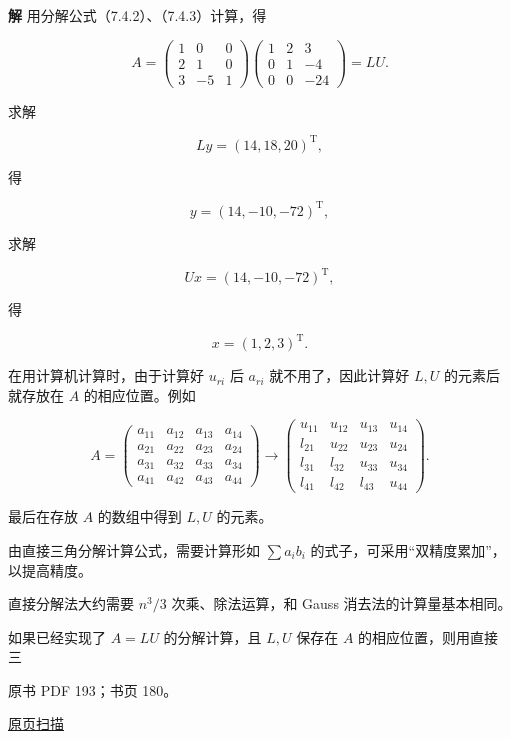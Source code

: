 \documentclass[
  10pt,
  fontset=fandol]{ctexart}
\begin{document}
\textbf{解} 用分解公式（7.4.2）、（7.4.3）计算，得

\[A=\begin{pmatrix}1&0&0\\2&1&0\\3&-5&1\end{pmatrix}
\begin{pmatrix}1&2&3\\0&1&-4\\0&0&-24\end{pmatrix}=LU.\]

求解

\[Ly=(14,18,20)^{\mathrm T},\]

得

\[y=(14,-10,-72)^{\mathrm T},\]

求解

\[Ux=(14,-10,-72)^{\mathrm T},\]

得

\[x=(1,2,3)^{\mathrm T}.\]

在用计算机计算时，由于计算好 \(u_{ri}\) 后 \(a_{ri}\) 就不用了，因此计算好 \(L,U\) 的元素后就存放在 \(A\) 的相应位置。例如

\[
A=\begin{pmatrix}
a_{11}&a_{12}&a_{13}&a_{14}\\
a_{21}&a_{22}&a_{23}&a_{24}\\
a_{31}&a_{32}&a_{33}&a_{34}\\
a_{41}&a_{42}&a_{43}&a_{44}
\end{pmatrix}
\to\begin{pmatrix}
u_{11}&u_{12}&u_{13}&u_{14}\\
l_{21}&u_{22}&u_{23}&u_{24}\\
l_{31}&l_{32}&u_{33}&u_{34}\\
l_{41}&l_{42}&l_{43}&u_{44}
\end{pmatrix}.
\]

最后在存放 \(A\) 的数组中得到 \(L,U\) 的元素。

由直接三角分解计算公式，需要计算形如 \(\sum a_i b_i\) 的式子，可采用``双精度累加''，以提高精度。

直接分解法大约需要 \(n^3/3\) 次乘、除法运算，和 Gauss 消去法的计算量基本相同。

如果已经实现了 \(A=LU\) 的分解计算，且 \(L,U\) 保存在 \(A\) 的相应位置，则用直接三

\clearpage

原书 PDF 193；书页 180。

\href{../../../source-images/pdf-193.jpeg}{原页扫描}
\end{document}
